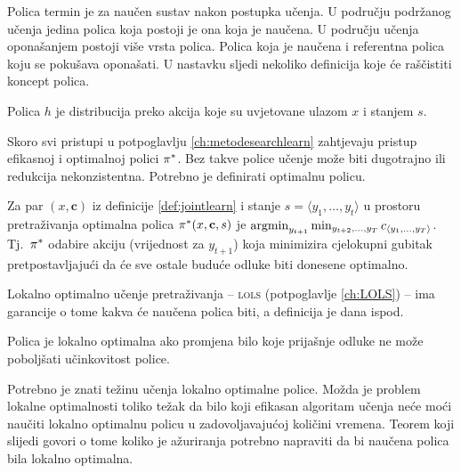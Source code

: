 Polica  termin je za naučen sustav nakon postupka učenja. U
području podržanog učenja jedina polica koja postoji je ona koja je naučena. U
području učenja oponašanjem  postoji više vrsta polica.
Polica koja je naučena i referentna polica koju se pokušava oponašati. U
nastavku sljedi nekoliko definicija koje će raščistiti koncept polica.

\begin{definition}[Polica]

  Polica $h$ je distribucija preko akcija koje su uvjetovane ulazom $x$ i
  stanjem $s$.

\end{definition}

\noindent Skoro svi pristupi u potpoglavlju \ref{ch:metodesearchlearn}
zahtjevaju pristup efikasnoj i optimalnoj polici $\pi\ssymbol{1}$. Bez takve
police učenje može biti dugotrajno ili redukcija nekonzistentna. Potrebno je
definirati optimalnu policu.

\begin{definition}

  Za par $(x, \mathbf{c})$ iz definicije \ref{def:jointlearn} i stanje $s =
  \langle y_1, \ldots, y_t \rangle$ u prostoru pretraživanja optimalna polica
  $\pi\ssymbol{1}(x, \mathbf{c}, s)$ je $\operatorname*{argmin}_{y_{t+1}} \min_{y_{t+2},
  \ldots, y_T} c_{\langle y_1, \ldots, y_T \rangle}$. Tj.~$\pi\ssymbol{1}$
  odabire akciju (vrijednost za $y_{t+1}$) koja minimizira cjelokupni gubitak
  pretpostavljajući da će sve ostale buduće odluke biti donesene optimalno.

\end{definition}

\noindent Lokalno optimalno učenje pretraživanja -- \textsc{lols} (potpoglavlje
\ref{ch:LOLS}) --  ima garancije o tome kakva će naučena polica biti, a
definicija je dana ispod.

\begin{definition}

  Polica je lokalno optimalna ako promjena bilo koje prijašnje odluke ne može
  poboljšati učinkovitost police.

\end{definition}

\noindent Potrebno je znati težinu učenja lokalno optimalne police. Možda je
problem lokalne optimalnosti toliko težak da bilo koji efikasan algoritam učenja
neće moći naučiti lokalno optimalnu policu u zadovoljavajućoj količini vremena.
Teorem koji slijedi govori o tome koliko je ažuriranja potrebno napraviti da bi
naučena polica bila lokalno optimalna.

